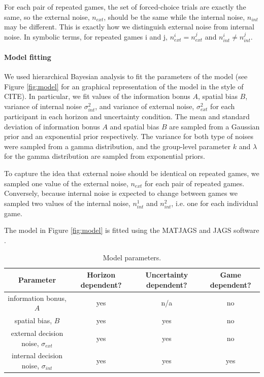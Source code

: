 \documentclass[12pt]{article}
\begin{document}
	For each pair of repeated games, the set of forced-choice trials are exactly the same, so the external noise, $n_{ext}$, should be the same while the internal noise, $n_{int}$ may be different. This is exactly how we distinguish external noise from internal noise. In symbolic terms, for repeated games i and j,  $n_{ext}^i=n_{ext}^j$  and $n_{int}^i \neq n_{int}^j$.
	
\paragraph{Model fitting}
	We used hierarchical Bayesian analysis to fit the parameters of the model (see Figure \ref{fig:model} for an graphical representation of the model in the style of CITE). In particular, we fit values of the information bonus $A$, spatial bias $B$, variance of internal noise $\sigma_{int}^2$, and variance of external noise, $\sigma_{ext}^2$ for each participant in each horizon and uncertainty condition. The mean and standard deviation of information bonus $A$ and spatial bias $B$ are sampled from a Gaussian prior and an exponential prior respectively. The variance for both type of noises were sampled from a gamma distribution, and the group-level parameter $k$ and $\lambda$ for the gamma distribution are sampled from exponential priors. 
	
	To capture the idea that external noise should be identical on repeated games, we sampled one value of the external noise, $n_{ext}$ for each pair of repeated games.  Conversely, because internal noise is expected to change between games we sampled two values of the internal noise, $n_{int}^1$ and $n_{int}^2$, i.e. one for each individual game.  
	
	The model in Figure \ref{fig:model} is fitted using the MATJAGS  and JAGS software \cite{}.
	
	\begin{table}[H]
		\small
		\begin{center}
			\begin{tabular}{|c|c|c|c|}
				\hline
				Parameter &
				Horizon dependent? &
				Uncertainty dependent? &
				Game dependent? \\
				\hline
				information bonus, $A$ &
				yes &
				n/a &
				no \\
				\hline
				spatial bias, $B$ &
				yes &
				yes &
				no \\
				\hline
				external decision noise, $\sigma_{ext}$ &
				yes & 
				yes &
				no \\
				\hline
				internal decision noise, $\sigma_{int}$ &
				yes & 
				yes &
				yes \\
				\hline
			\end{tabular}
		\end{center}
		\caption{Model parameters. }
		\label{table1}
	\end{table}%
	
\end{document}
